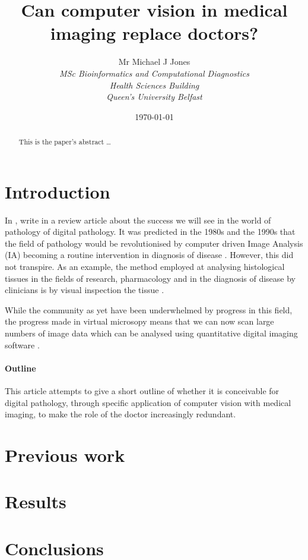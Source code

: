 \documentclass[12pt]{article}
\title{Can computer vision in medical imaging replace doctors?} %
\author{
        Mr Michael J Jones \\
                \em{MSc Bioinformatics and Computational Diagnostics}\\
       	Health Sciences Building\\
        Queen's University Belfast
}
\date{\today}
\begin{document}
\maketitle

\begin{abstract}
This is the paper's abstract \ldots
\end{abstract}

\section{Introduction}
In \citeyear{hamilton2014digital}, \citeauthor{hamilton2014digital} write in a review article about the success we 
will see in the world of pathology of digital pathology. It was predicted in the 1980s and the 1990s that the field of 
pathology would be revolutionised by computer driven Image Analysis (IA) becoming a routine intervention in diagnosis 
of disease \parencite{hamilton2014digital}. However, this did not transpire. As an example, the method employed 
at analysing histological tissues in the fields of research, pharmacology and in the diagnosis of disease by clinicians is 
by visual inspection the tissue \parencite{kriete2005automated}.

While the community as yet have been underwhelmed by progress in this field, the progress made in virtual microsopy 
means that we can now scan large numbers of image data which can be analysed using quantitative digital imaging 
software \parencite{mccavigan2012digital}.


\paragraph{Outline}
This article attempts to give a short outline of whether it is conceivable for digital pathology, through specific 
application of computer vision with medical imaging, to make the role of the doctor increasingly redundant.

\section{Previous work}\label{previous work}

\section{Results}\label{results}

\section{Conclusions}\label{conclusions}

\printbibliography
\end{document}
